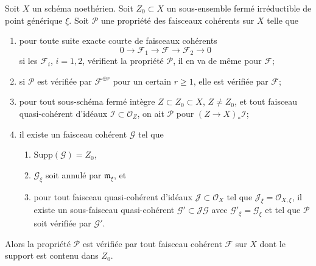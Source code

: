\begin{lemma}
\label{lemma-property-irreducible-higher-rank-cohomological}
Soit $X$ un schéma noethérien. Soit $Z_0 \subset X$ un sous-ensemble
fermé irréductible de point générique $\xi$. Soit $\mathcal{P}$ une propriété
des faisceaux cohérents sur $X$ telle que
\begin{enumerate}
\item pour toute suite exacte courte de faisceaux cohérents
$$
0 \to \mathcal{F}_1 \to \mathcal{F} \to \mathcal{F}_2 \to 0
$$
si les $\mathcal{F}_i$, $i = 1, 2$, vérifient la propriété $\mathcal{P}$,
il en va de même pour $\mathcal{F}$;
\item si $\mathcal{P}$ est vérifiée par $\mathcal{F}^{\oplus r}$ pour
un certain $r \geq 1$, elle est vérifiée par $\mathcal{F}$;
\item pour tout sous-schéma fermé intègre $Z \subset Z_0 \subset X$,
$Z \not = Z_0$, et tout faisceau quasi-cohérent d'idéaux
$\mathcal{I} \subset \mathcal{O}_Z$, on ait
$\mathcal{P}$ pour $(Z \to X)_*\mathcal{I}$;
\item il existe un faisceau cohérent $\mathcal{G}$ tel que
\begin{enumerate}
\item $\text{Supp}(\mathcal{G}) = Z_0$,
\item $\mathcal{G}_\xi$ soit annulé par $\mathfrak m_\xi$, et
\item pour tout faisceau quasi-cohérent d'idéaux
$\mathcal{J} \subset \mathcal{O}_X$ tel que
$\mathcal{J}_\xi = \mathcal{O}_{X, \xi}$, il existe un sous-faisceau quasi-cohérent
$\mathcal{G}' \subset \mathcal{J}\mathcal{G}$ avec
$\mathcal{G}'_\xi = \mathcal{G}_\xi$ et tel que
$\mathcal{P}$ soit vérifiée par $\mathcal{G}'$.
\end{enumerate}
\end{enumerate}
Alors la propriété $\mathcal{P}$ est vérifiée par tout faisceau cohérent
$\mathcal{F}$ sur $X$ dont le support est contenu dans $Z_0$.
\end{lemma}

